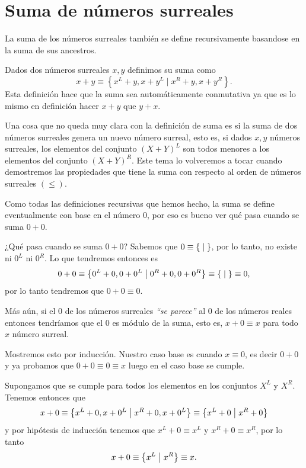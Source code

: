 \section{Suma de números surreales}

    La suma de los números surreales también se define recursivamente basandose en la suma de sus ancestros.
    
    \begin{definition}
        Dados dos n\'umeros surreales $x,y$ definimos su suma como
        \[
            x + y  \equiv \left\{x^L+y, x+y^L\;|\;x^R+y, x+y^R\right\}.
        \]
        Esta definici\'on hace que la suma sea autom\'aticamente conmutativa ya que es lo mismo en definici\'on hacer $x+y$ que $y+x$.
    \end{definition}

    Una cosa que no queda muy clara con la definici\'on de suma es si la suma de dos n\'umeros surreales genera un nuevo n\'umero surreal, esto es, si dados $x,y$ n\'umeros surreales, los elementos del conjunto $(X+Y)^L$ son todos menores a los elementos del conjunto $(X+Y)^R$. Este tema lo volveremos a tocar cuando demostremos las propiedades que tiene la suma con respecto al orden de n\'umeros surreales $(\le)$.

    Como todas las definiciones recursivas que hemos hecho, la suma se define eventualmente con base en el número $0$, por eso es bueno ver qué pasa cuando se suma $0+0$.

    \begin{example}
        ¿Qué pasa cuando se suma $0+0$? Sabemos que $0 \equiv \left\{\;\middle|\; \right\}$, por lo tanto, no existe ni $0^L$ ni $0^R$. Lo que tendremos entonces es
        \[
            0+0 \equiv \left\{0^L+0, 0+0^L\;\middle|\; 0^R+0, 0+0^R\right\} \equiv \left\{\;\middle|\; \right\} \equiv 0,
        \]
        por lo tanto tendremos que $0+0 \equiv 0$.
    \end{example}

    \begin{example}
        Más aún, si el $0$ de los números surreales \textit{``se parece''} al $0$ de los números reales entonces tendríamos que el $0$ es módulo de la suma, esto es, $x+0 \equiv x$ para todo $x$ n\'umero surreal.

        Mostremos esto por inducci\'on. Nuestro caso base es cuando $x \equiv 0$, es decir $0+0$ y ya probamos que $0+0\equiv 0\equiv x$ luego en el caso base se cumple.

        Supongamos que se cumple para todos los elementos en los conjuntos $X^L$ y $X^R$. Tenemos entonces que
        \[
            x + 0 \equiv \left\{x^L+0, x+0^L\;\middle|\; x^R+0, x+0^L\right\} \equiv \left\{x^L+0\;\middle|\; x^R+0\right\}
        \]
        y por hip\'otesis de inducci\'on tenemos que $x^L+0 \equiv x^L$ y $x^R+0 \equiv x^R$, por lo tanto 
        \[
            x + 0 \equiv \left\{x^L\;\middle|\; x^R\right\} \equiv x.
        \]
    \end{example}

